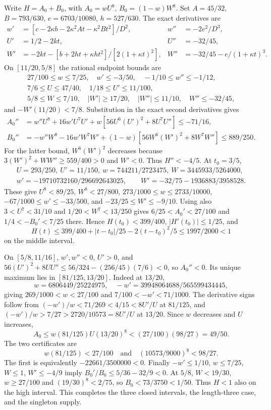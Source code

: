 Write $H=A_0+B_0$, with $A_0=wU^8$, $B_0=(1-w)W^8$.
Set $A=45/32$, $B=793/630$, $e=6703/10080$, $h=527/630$.
The exact derivatives are
\begin{align*}
 w'&=[c-2\kappa b-2\kappa^2At-\kappa^2Bt^2]/D^2,&w''&=-2e^2/D^3,\\
 U'&=1/2-2kt,&U''&=-32/45,\\
 W'&=-2kt-[b+2ht+\kappa ht^2]/[2(1+\kappa t)^2],&
 W''&=-32/45-e/(1+\kappa t)^3.
\end{align*}
On $[11/20,5/8]$ the rational endpoint bounds are
\begin{gather*}
 27/100\le w\le7/25,\quad w'\le-3/50,\quad-1/10\le w''\le-1/12,\\
 7/6\le U\le47/40,\quad1/18\le U'\le11/100,\\
 5/8\le W\le7/10,\quad |W'|\ge17/20,\quad |W''|\le11/10,\quad W''\le-32/45,
\end{gather*}
and $-W'(11/20)<7/8$.
Substitution in the exact second derivatives gives
\begin{align*}
 A_0''&=w''U^8+16w'U^7U'+w[56U^6(U')^2+8U^7U'']\le-71/16,\\
 B_0''&=-w''W^8-16w'W^7W'+(1-w)[56W^6(W')^2+8W^7W'']\le889/250.
\end{align*}
For the latter bound, $W^6(W')^2$ decreases because
$3(W')^2+WW''\ge559/400>0$ and $W'<0$.
Thus $H''<-4/5$. At $t_0=3/5$,
\begin{gather*}
 U=293/250,\ U'=11/150,\ w=744211/2723475,\ W=3445933/5264000,\\
 w'=-19710732160/296692643025,\qquad W'=-32/75-1936883/3958528.
\end{gather*}
These give $U^8<89/25$, $W^8<27/800$, $273/1000\le w\le2733/10000$,
$-67/1000\le w'\le-33/500$, and $-23/25\le W'\le-9/10$.
Using also $3<U^7<31/10$ and $1/20<W^7<13/250$ gives
$6/25<A_0'<27/100$ and $1/4<-B_0'<7/25$ there.
Hence $H(t_0)<399/400$, $|H'(t_0)|\le1/25$, and
\[
 H(t)\le399/400+|t-t_0|/25-2(t-t_0)^2/5\le1997/2000<1
\]
on the middle interval.

On $[5/8,11/16]$, $w',w''<0$, $U'>0$, and
$56(U')^2+8UU''\le56/324-(256/45)(7/6)<0$, so $A_0''<0$.
Its unique maximum lies in $[81/125,13/20]$.
Indeed at $13/20$,
\[
 w=6806449/25224975,\quad -w'=39948064688/565599434445,
\]
giving $269/1000<w<27/100$ and $7/100<-w'<71/1000$.
The derivative signs follow from
$(-w')/w<71/269<4/15<8U'/U$ at $81/125$, and
$(-w')/w>7/27>2720/10573=8U'/U$ at $13/20$.
Since $w$ decreases and $U$ increases,
\[
 A_0\le w(81/125)U(13/20)^8<(27/100)(98/27)=49/50.
\]
The two certificates are
\[
 w(81/125)<27/100\quad\text{and}\quad(10573/9000)^8<98/27.
\]
The first is equivalently $-22661/3500000<0$.
Finally $-w'\le1/10$, $w\le7/25$, $W\le1$, $W'\le-4/9$ imply
$B_0'/B_0\le5/36-32/9<0$. At $5/8$, $W<19/30$, $w\ge27/100$ and
$(19/30)^8<2/75$, so $B_0<73/3750<1/50$.
Thus $H<1$ also on the high interval. This completes the three closed
intervals, the length-three case, and the singleton supply.
